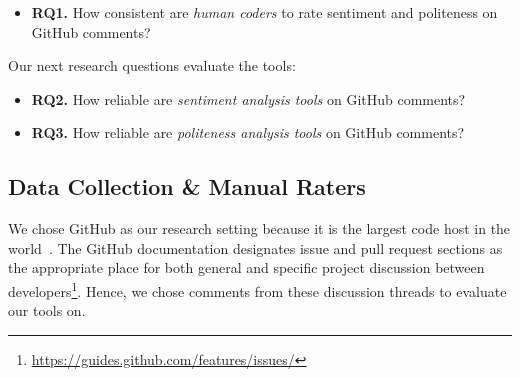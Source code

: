 \begin{itemize}

\item\textbf{RQ1.} How consistent are \emph{human coders} to rate sentiment and politeness on GitHub comments?

\end{itemize}

\noindent
Our next research questions evaluate the tools:

\begin{itemize}

\item\textbf{RQ2.} How reliable are \emph{sentiment analysis tools} on GitHub comments?

\item\textbf{RQ3.} How reliable are \emph{politeness analysis tools} on GitHub comments? 

\end{itemize}

\subsection{Data Collection \& Manual Raters}\label{data}

We chose GitHub as our research setting 
because it is the largest code host 
in the world~\cite{gousios2014lean}. 
The GitHub  documentation designates 
issue and pull request sections 
as the appropriate place for 
both general and specific project discussion
 between developers\footnote{\url{https://guides.github.com/features/issues/}}.
 Hence, we chose comments from these discussion threads 
 to evaluate our tools on. 


